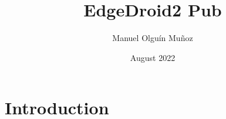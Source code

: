 \documentclass{article}
\title{EdgeDroid2 Pub}
\author{Manuel Olguín Muñoz}
\date{August 2022}
\begin{document}
\maketitle

\section{Introduction}
\end{document}
